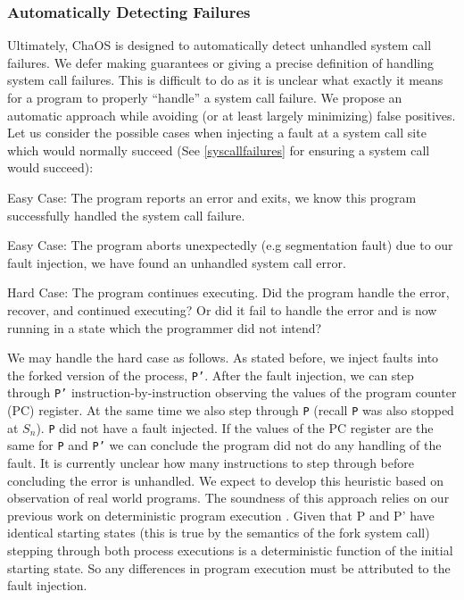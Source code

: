 \subsubsection{Automatically Detecting Failures}
Ultimately, ChaOS is designed to automatically detect unhandled system call failures. We defer making guarantees or giving a precise definition of handling system call failures. This is difficult to do as it is unclear what exactly it means for a program to properly ``handle'' a system call failure. We propose an automatic approach while avoiding (or at least largely minimizing) false positives. Let us consider the possible cases when injecting a fault at a system call site which would normally succeed (See \ref{syscallfailures} for ensuring a system call would succeed):
\begin{compactitem}

\item Easy Case: The program reports an error and exits, we know this program successfully handled the system call failure.
\item Easy Case: The program aborts unexpectedly (e.g segmentation fault) due to our fault injection, we have found an unhandled system call error.
\item Hard Case: The program continues executing. Did the program handle the error, recover, and continued executing? Or did it fail to handle the error and is now running in a state which the programmer did not intend?
\end{compactitem}
We may handle the hard case as follows. As stated before, we inject faults into the forked version of the process, \texttt{P'}. After the fault injection, we can step through \texttt{P'} instruction-by-instruction observing the values of the program counter (PC) register. At the same time we also step through \texttt{P} (recall \texttt{P} was also stopped at $S_n$). \texttt{P} did not have a fault injected. If the values of the PC register are the same for \texttt{P} and \texttt{P'} we can conclude the program did not do any handling of the fault. It is currently unclear how many instructions to step through before concluding the error is unhandled. We expect to develop this heuristic based on observation of real world programs.
The soundness of this approach relies on our previous work on deterministic program execution \cite{dettrace}. Given that P and P’ have identical starting states (this is true by the semantics of the fork system call) stepping through both process executions is a deterministic function of the initial starting state. So any differences in program execution must be attributed to the fault injection.

